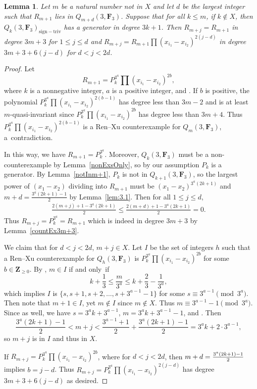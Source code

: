 \documentclass[pdftex]{sigma}
\newtheorem{Lemma}[Theorem]{Lemma}
\theoremstyle{definition}
\numberwithin{equation}{section}
\newcommand{\siv}{\mathrm{sign-triv}}
\begin{document}
\begin{Lemma}\label{staircase}
 Let $m$ be a natural number not in $X$ and let $d$ be the largest integer such that $R_{m+1}$ lies in $Q_{m+d}(3,\mathbf{F}_3)$. Suppose that for all $k\leq m$, if $k\not\in X$, then $Q_k(3,\mathbf{F}_3)_\siv$ has a generator in degree $3k+1$. Then $R_{m+j}=R_{m+1}$ in degree $3m+3$ for $1\leq j\leq d$ and $R_{m+j}=R_{m+1}\prod (x_{i_1}-x_{i_2})^{2(j-d)}$ in degree $3m+3+6(j-d)$ for $d< j<2d$.
\end{Lemma}
\begin{proof}
 Let
 \[
 R_{m+1}=P_k^{3^a}\prod(x_{i_1}-x_{i_2})^{2b},
 \]
 where $k$ is a nonnegative integer, $a$ is a positive integer, and . If $b$ is positive, the polynomial $P_k^{3^a}\prod(x_{i_1}-x_{i_2})^{2(b-1)}$ has degree less than $3m-2$ and is at least $m$-quasi-invariant since $P_k^{3^a}\prod(x_{i_1}-x_{i_2})^{2b}$ has degree less than $3m+4$. Thus $P_k^{3^a}\prod(x_{i_1}-x_{i_2})^{2(b-1)}$ is a Ren--Xu counterexample for $Q_m(3,\mathbf{F}_3)$, a~contradiction.

 In this way, we have $R_{m+1}=P_k^{3^a}$. Moreover, $Q_k(3,\mathbf{F}_3)$ must be a non-counterexample by Lemma~\ref{nonExsOnly}, so by our assumption $P_k$ is a generator. By Lemma~\ref{notInm+1}, $P_k$ is not in $Q_{k+1}(3,\mathbf{F}_3)$, so the largest power of $(x_1-x_2)$ dividing into $R_{m+1}$ must be $(x_1-x_2)^{3^a(2k+1)}$ and $m+d=\frac{3^a(2k+1)-1}{2}$ by Lemma~\ref{lem:3.1}. Then for all $1\leq j\leq d$,
 \begin{align*}
 \frac{2(m+j)+1-3^a(2k+1)}{2} \leq \frac{2(m+d)+1-3^a(2k+1)}{2}= 0.
 \end{align*}
 Thus $R_{m+j}=P_k^{3^a}=R_{m+1}$ which is indeed in degree $3m+3$ by Lemma~\ref{countEx3m+3}.

 We claim that for $d<j< 2d$, $m+j\in X$. Let $I$ be the set of integers $h$ such that a Ren--Xu counterexample for $Q_h(3,\mathbf{F}_3)$ is $P_k^{3^a}\prod(x_{i_1}-x_{i_2})^{2b}$ for some $b\in \mathbf{Z}_{\geq 0}$. By \cite{Ren_2020}, $m\in I$ if and only~if
 \[k+\frac{1}{3}\leq \frac{m}{3^a}\leq k+\frac{2}{3}-\frac{1}{3^a},\]
 which implies $I$ is $\bigl\{s,s+1,s+2,\ldots,s+3^{a-1}-1\bigr\}$ for some $s\equiv 3^{a-1} \pmod{3^a}$. Then note that $m+1\in I$, yet $m\not\in I$ since $m\not\in X$. Thus $m\equiv 3^{a-1}-1\pmod{3^a}$. Since  as well, we have $s=3^ak+3^{a-1}$, $m=3^ak+3^{a-1}-1$, and . Then
 \[\frac{3^a(2k+1)-1}{2}< m+j< \frac{3^{a-1}+1}{2}+ \frac{3^a(2k+1)-1}{2} = 3^ak+2\cdot 3^{a-1},\]
 so $m+j$ is in $I$ and thus in $X$.

If $R_{m+j}=P_k^{3^a}\prod(x_{i_1}-x_{i_2})^{2b}$, where  for $d<j< 2d$, then $m+d=\smash{\frac{3^a(2k+1)-1}{2}}$ implies $b=j-d$. Thus $R_{m+j}=P_k^{3^a}\prod(x_{i_1}-x_{i_2})^{2(j-d)}$ has degree $3m+3+6(j-d)$ as desired.
\end{proof}
\end{document}
